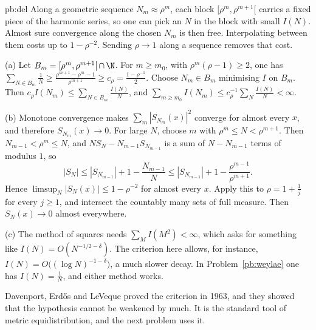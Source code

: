 \begin{solution}{pb:del}
\idea Along a geometric sequence $N_m\approx\rho^m$, each block $[\rho^m,\rho^{m+1}[$ carries a fixed piece of the harmonic series, so one can pick an $N$ in the block with small $I(N)$. Almost sure convergence along the chosen $N_m$ is then free. Interpolating between them costs up to $1-\rho^{-2}$. Sending $\rho\to 1$ along a sequence removes that cost.

\writeup (a) Let $B_m=[\rho^m,\rho^{m+1}[\,\cap\,\N$. For $m\ge m_0$, with $\rho^m(\rho-1)\ge 2$, one has $\sum_{N\in B_m}\frac1N\ge\frac{\rho^{m+1}-\rho^m-1}{\rho^{m+1}}\ge c_\rho=\frac{1-\rho^{-1}}2$. Choose $N_m\in B_m$ minimising $I$ on $B_m$. Then $c_\rho I(N_m)\le\sum_{N\in B_m}\frac{I(N)}N$, and $\sum_{m\ge m_0}I(N_m)\le c_\rho^{-1}\sum_N\frac{I(N)}N<\infty$.

(b) Monotone convergence makes $\sum_m|S_{N_m}(x)|^2$ converge for almost every $x$, and therefore $S_{N_m}(x)\to 0$. For large $N$, choose $m$ with $\rho^m\le N<\rho^{m+1}$. Then $N_{m-1}<\rho^m\le N$, and $NS_N-N_{m-1}S_{N_{m-1}}$ is a sum of $N-N_{m-1}$ terms of modulus $1$, so
\[
|S_N|\le|S_{N_{m-1}}|+1-\frac{N_{m-1}}N\le|S_{N_{m-1}}|+1-\frac{\rho^{m-1}}{\rho^{m+1}}.
\]
Hence $\limsup_N|S_N(x)|\le 1-\rho^{-2}$ for almost every $x$. Apply this to $\rho=1+\frac1j$ for every $j\ge 1$, and intersect the countably many sets of full measure. Then $S_N(x)\to 0$ almost everywhere.

(c) The method of squares needs $\sum_M I(M^2)<\infty$, which asks for something like $I(N)=O(N^{-1/2-\delta})$. The criterion here allows, for instance, $I(N)=O\bigl((\log N)^{-1-\delta}\bigr)$, a much slower decay. In Problem~\ref{pb:weylae} one has $I(N)=\frac1N$, and either method works.

\leads Davenport, Erdős and LeVeque proved the criterion in 1963, and they showed that the hypothesis cannot be weakened by much. It is the standard tool of metric equidistribution, and the next problem uses it.
\end{solution}

